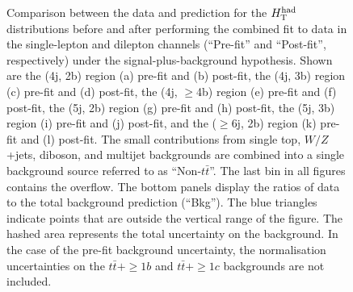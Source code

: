 \begin{figure}[htbp!]
\captionsetup{width=0.85\textwidth}  \caption{\small Comparison between the data and prediction for the $H_{\rm T}^{\rm had}$ distributions before and after performing the combined fit to data in the single-lepton and dilepton channels (``Pre-fit'' and ``Post-fit'', respectively) under the signal-plus-background hypothesis. Shown are the (4j, 2b) region (a) pre-fit and (b) post-fit, the (4j, 3b) region (c) pre-fit and (d) post-fit, the (4j, $\ge$4b) region (e) pre-fit and (f) post-fit, the (5j, 2b)  region (g) pre-fit and (h) post-fit, the (5j, 3b)  region (i) pre-fit and (j) post-fit, and the ($\ge$6j, 2b) region (k) pre-fit and (l) post-fit.
The small contributions from single top, $W/Z$+jets, diboson, and multijet backgrounds are combined into a single background source  referred to as ``Non-$t\bar{t}$''. The last bin in all figures contains the overflow. The bottom panels display the ratios of data to the total background prediction (``Bkg''). The blue triangles indicate points that are outside the vertical range of the figure. The hashed area represents the total uncertainty on the background. In the case of the pre-fit background uncertainty, the normalisation uncertainties on the $t\bar{t}+\ge1b$ and $t\bar{t}+\ge1c$ backgrounds are not included.}
\label{sec:tth:fig:hthad1}
\end{figure}


